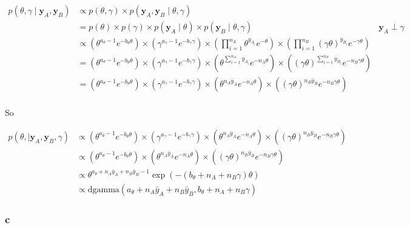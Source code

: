 \documentclass[]{article}
\begin{document}
\[
\begin{align}
p(\theta, \gamma \mid \boldsymbol{y}_A, \boldsymbol{y}_B)
&\propto p(\theta, \gamma) \times p(\boldsymbol{y}_A, \boldsymbol{y}_B \mid \theta, \gamma) \\
&= p(\theta) \times p(\gamma) \times p(\boldsymbol{y}_A \mid \theta) \times p(\boldsymbol{y}_B \mid \theta, \gamma) & \boldsymbol{y}_A \perp \gamma \\
&\propto \left(\theta^{a_\theta - 1}e^{-b_\theta \theta}\right) \times \left(\gamma^{a_\gamma - 1}e^{-b_\gamma \gamma} \right) \times  \left(\prod_{i=1}^{n_{A}} \theta^{y_{A_i}} e^{-\theta} \right) \times \left(\prod_{i=1}^{n_{B}} (\gamma \theta)^{y_{B_i}} e^{-\gamma \theta} \right) \\
&= \left(\theta^{a_\theta - 1}e^{-b_\theta \theta}\right) \times \left(\gamma^{a_\gamma - 1}e^{-b_\gamma \gamma} \right) \times  \left( \theta^{\sum_{i = 1}^{n_A} y_{A_i}} e^{-n_A \theta} \right) \times \left( (\gamma \theta)^{\sum_{i=1}^{n_B} y_{B_i}} e^{- n_B \gamma \theta} \right) \\
&= \left(\theta^{a_\theta - 1}e^{-b_\theta \theta}\right) \times \left(\gamma^{a_\gamma - 1}e^{-b_\gamma \gamma} \right) \times  \left( \theta^{n_A \bar{y}_A} e^{-n_A \theta} \right) \times \left( (\gamma \theta)^{n_B \bar{y}_B} e^{- n_B \gamma \theta} \right) \\
\end{align}
\]

So

\[
\begin{align}
p(\theta, \mid \boldsymbol{y}_A, \boldsymbol{y}_B, \gamma)
&\propto \left(\theta^{a_\theta - 1}e^{-b_\theta \theta}\right) \times \left(\gamma^{a_\gamma - 1}e^{-b_\gamma \gamma} \right) \times  \left( \theta^{n_A \bar{y}_A} e^{-n_A \theta} \right) \times \left( (\gamma \theta)^{n_B \bar{y}_B} e^{- n_B \gamma \theta} \right) \\
&\propto \left(\theta^{a_\theta - 1}e^{-b_\theta \theta}\right) \times \left( \theta^{n_A \bar{y}_A} e^{-n_A \theta} \right) \times \left( (\gamma \theta)^{n_B \bar{y}_B} e^{- n_B \gamma \theta} \right) \\
&\propto \theta^{a_\theta + n_A \bar{y}_A + n_B \bar{y}_B - 1} \exp \left( - (b_\theta + n_A + n_B \gamma ) \theta \right) \\
&\propto \text{dgamma}\left(a_\theta + n_A \bar{y}_A + n_B \bar{y}_B, b_\theta + n_A + n_B \gamma \right)
\end{align}
\]

\hypertarget{c}{%
\subsubsection{c}\label{c}}
\end{document}
